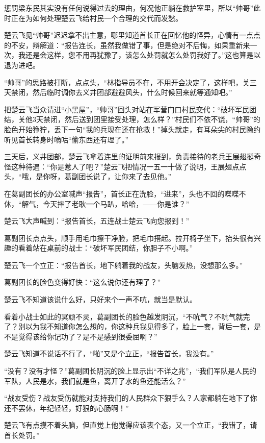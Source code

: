 惩罚梁东民其实没有任何说得过去的理由，何况他正躺在救护室里，所以“帅哥”此时正在为如何处理楚云飞给村民一个合理的交代而发愁。

楚云飞见“帅哥”迟迟拿不出主意，哪里知道首长正在回忆他的怪异，心情有一点点的不安，辩解道：“报告连长，虽然我做错了事，但是绝对不后悔，如果重新来一次，我还是会这样，您不用再犹豫了，该怎么处罚就怎么处罚我好了。”这也算是以退为进吧。

“帅哥”的思路被打断，点点头，“林指导员不在，不用开会决定了，这样吧，关三天禁闭，然后临时调你去义井团部避避风头，什么时候回来就等通知吧。”

把楚云飞当众请进“小黑屋”，“帅哥”回头对站在军营门口村民交代：“破坏军民团结，关他3天禁闭，然后送到团里接受处理，怎么样？”村民们不依不饶，“帅哥”的脸色开始狰狞，丢下一句“我的兵现在还在抢救！”掉头就走，有耳朵尖的村民隐约听见首长转身时嘀咕“偷东西还有理了。”

三天后，义井团部，楚云飞拿着连里的证明前来报到，负责接待的老兵王展翅挺奇怪这种待遇：“你是惹人了吧？”楚云飞把情况一五一十做了说明，王展翅点点头，“哦，是你呀，葛副团长说了，让你来了去见他。”

在葛副团长的办公室喊声“报告”，首长正在洗脸，“进来”，头也不回的喋喋不休，“解气，今天摔了老耿一个马趴，哈哈，——你是谁？”

楚云飞大声喊到：“报告首长，五连战士楚云飞向您报到！”

葛副团长点点头，顺手用毛巾擦干净脸，把毛巾搭起。拉开椅子坐下，抬头很有兴趣的看着站在桌前的战士：“破坏军民团结，你胆子不小啊。”

楚云飞一个立正：“报告首长，地下躺着我的战友，头脑发热，没想那么多。”

葛副团长的脸色变得好快：“这么说你还有理了？”

楚云飞不知道该说什么好，只好来个一声不吭，就当是默认。

看着小战士如此的冥顽不灵，葛副团长的脸色越发阴沉，“不吭气？不吭气就完了？别以为我不知道你怎么想的，你这种兵我见得多了，脸上一套，背后一套，是不是觉得该给你记功了？是不是感到很委屈啊？”

楚云飞知道不说话不行了，“啪”又是个立正，“报告首长，我没有。”

“没有？没有才怪？”葛副团长阴沉的脸上显示出“不详之兆”，“我们军队是人民的军队，人民是水，我们就是鱼，离开了水的鱼还能活么？”

“战友受伤？战友受伤就能对支持我们的人民群众下狠手么？人家都躺在地下了你还不罢休，年纪轻轻，好狠的心肠啊！”

楚云飞有点摸不着头脑，但直觉上他觉得应该表个态，又一个立正，“我错了，请首长处罚。”

